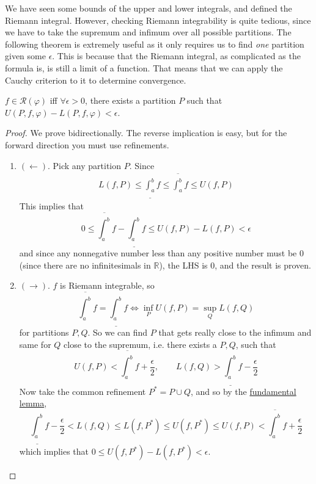   We have seen some bounds of the upper and lower integrals, and defined the Riemann integral. However, checking Riemann integrability is quite tedious, since we have to take the supremum and infimum over all possible partitions. The following theorem is extremely useful as it only requires us to find \textit{one} partition given some $\epsilon$. This is because that the Riemann integral, as complicated as the formula is, is still a limit of a function. That means that we can apply the Cauchy criterion to it to determine convergence. 

  \begin{theorem}
    \label{thm:cauchy-riemann-integrability}
    $f \in \mathcal{R}(\varphi)$ iff $\forall \epsilon > 0$, there exists a partition $P$ such that $U(P, f, \varphi) - L(P, f, \varphi) < \epsilon$. 
  \end{theorem}
  \begin{proof}
    We prove bidirectionally. The reverse implication is easy, but for the forward direction you must use refinements. 
    \begin{enumerate}
      \item $(\leftarrow)$. Pick any partition $P$. Since
        \begin{align}
          L(f, P) \leq \underline{\int_a^b} f \leq \overline{\int_a^b} f \leq U(f, P)
        \end{align}
        This implies that 
        \begin{equation}
          0 \leq \overline{\int_a^b} f - \underline{\int_a^b} f \leq U(f, P) - L(f, P) < \epsilon 
        \end{equation}
        and since any nonnegative number less than any positive number must be $0$ (since there are no infinitesimals in $\mathbb{R}$), the LHS is $0$, and the result is proven.  

      \item $(\rightarrow)$. $f$ is Riemann integrable, so  
        \begin{equation}
          \overline{\int_a^b} f = \underline{\int_a^b} f \iff \inf_P U(f, P) = \sup_{Q} L(f, Q) 
        \end{equation}
        for partitions $P, Q$. So we can find $P$ that gets really close to the infimum and same for $Q$ close to the supremum, i.e. there exists a $P, Q$, such that
        \begin{equation}
          U(f, P) < \overline{\int_a^b} f + \frac{\epsilon}{2}, \qquad L(f, Q) > \underline{\int_a^b} f - \frac{\epsilon}{2}
        \end{equation}
        Now take the common refinement $P^\ast = P \cup Q$, and so by the \hyperref[thm:fundamental-lemma]{fundamental lemma}, 
        \begin{equation}
          \underline{\int_a^b} f - \frac{\epsilon}{2} < L(f, Q) \leq L(f, P^\ast) \leq U(f, P^\ast) \leq U(f, P) < \overline{\int_a^b} f + \frac{\epsilon}{2}
        \end{equation} 
        which implies that $0 \leq U(f, P^\ast) - L(f, P^\ast) < \epsilon$. 
    \end{enumerate}
  \end{proof}  

